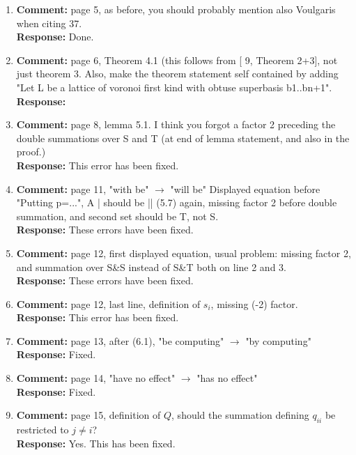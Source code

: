 \documentclass[a4paper,10pt]{article}
\begin{document}
\begin{enumerate}
\item\textbf{Comment:}  
page 5, as before, you should probably mention also Voulgaris when citing 37. 
\\\textbf{Response:}
Done.

\item\textbf{Comment:}  
page 6, Theorem 4.1 (this follows from [ 9, Theorem 2+3], not just theorem 3. 
Also, make the theorem statement self contained by adding "Let L be a lattice of voronoi first kind with obtuse superbasis b1..bn+1". 
\\\textbf{Response:}

\item\textbf{Comment:}  
page 8, lemma 5.1. I think you forgot a factor 2 preceding the double summations over S and T (at end of lemma statement, and also in the proof.) 
\\\textbf{Response:}
This error has been fixed.

\item\textbf{Comment:}  
page 11, "with be" $\to$ "will be" Displayed equation before "Putting p=...", A | should be || (5.7) again, missing factor 2 before double summation, and second set should be T, not S. 
\\\textbf{Response:}
These errors have been fixed.

\item\textbf{Comment:}  
page 12, first displayed equation, usual problem: missing factor 2, and summation over S\&S instead of S\&T both on line 2 and 3. 
\\\textbf{Response:}
These errors have been fixed.

\item\textbf{Comment:}  
page 12, last line, definition of $s_i$, missing (-2) factor. 
\\\textbf{Response:}
This error has been fixed.

\item\textbf{Comment:}  
page 13, after (6.1), "be computing" $\to$ "by computing" 
\\\textbf{Response:}
Fixed.

\item\textbf{Comment:}  
page 14, "have no effect" $\to$ "has no effect" 
\\\textbf{Response:}
Fixed.

\item\textbf{Comment:}  
page 15, definition of $Q$, should the summation defining $q_{ii}$ be restricted to $j\neq i$? 
\\\textbf{Response:}
Yes. This has been fixed.


\end{enumerate}
\end{document}
